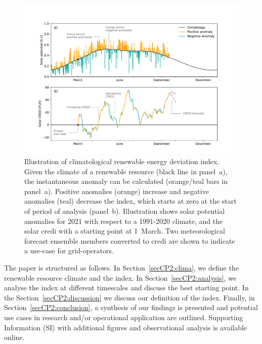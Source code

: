 \documentclass[12pt]{iopart}
\newcommand{\credi}[0]{{\sc credi}}
\newcommand{\sdi}[0]{{\sc solar credi}}
\begin{document}
\begin{figure}[b]
        \centering
        \includegraphics[width=\textwidth]{Figures/Schematic_CREDI.pdf}
        \caption{
                Illustration of climatological renewable energy deviation index. 
                Given the climate of a renewable resource (black line in panel~a), the instantaneous anomaly can be calculated (orange/teal bars in panel~a). 
                Positive anomalies (orange) increase and negative anomalies (teal) decrease the index, which starts at zero at the start of period of analysis (panel~b). 
                Illustration shows solar potential anomalies for 2021 with respect to a 1991-2020 climate, and the \sdi{} with a starting point at 1~March. 
                Two meteorological forecast ensemble members converted to \credi{} are shown to indicate a use-case for grid-operators. }
        \label{fig:overview}
\end{figure}

The paper is structured as follows. 
In Section~\ref{secCP2:clima}, we define the renewable resource climate and the index. 
In Section~\ref{secCP2:analysis}, we analyse the index at different timescales and discuss the best starting point. 
In the Section~\ref{secCP2:discussion} we discuss our definition of the index. 
Finally, in Section~\ref{secCP2:conclusion}, a synthesis of our findings is presented and potential use cases in research and/or operational application are outlined. 
Supporting Information (SI) with additional figures and observational analysis is available online.
\end{document}
